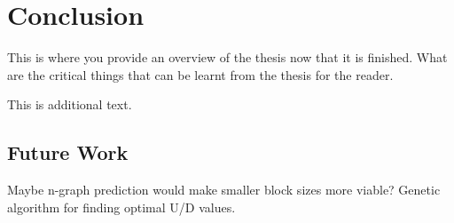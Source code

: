 \chapter{Conclusion}
\label{chap:conclusion}
This is where you provide an overview of the thesis now that it is finished.  What are the critical things that can be learnt from the thesis for the reader.

This is additional text.

\section{Future Work}
\label{sec:future}
Maybe n-graph prediction would make smaller block sizes more viable?
Genetic algorithm for finding optimal U/D values.
